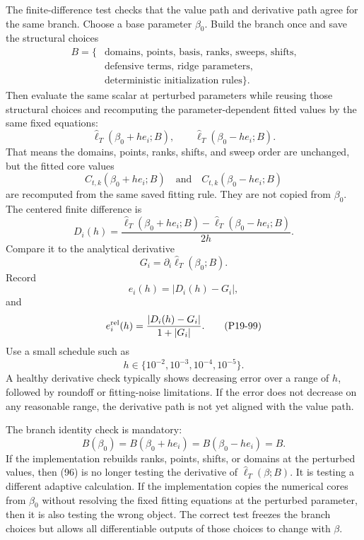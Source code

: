 \documentclass[11pt]{article}
\newcommand{\widehatell}{\widehat\ell}
\begin{document}
The finite-difference test checks that the value path and derivative path agree
for the same branch.  Choose a base parameter \(\beta_0\).  Build the branch
once and save the structural choices
\[
    \begin{aligned}
    B=\{&
    \text{domains, points, basis, ranks, sweeps, shifts,}\\
    &\text{defensive terms, ridge parameters,}\\
    &\text{deterministic initialization rules}\}.
    \end{aligned}
    \tag{P19-94}
\]
Then evaluate the same scalar at perturbed parameters while reusing those
structural choices and recomputing the parameter-dependent fitted values by the
same fixed equations:
\[
    \widehatell_T(\beta_0+h e_i;B),
    \qquad
    \widehatell_T(\beta_0-h e_i;B).
    \tag{P19-95}
\]
That means the domains, points, ranks, shifts, and sweep order are unchanged,
but the fitted core values
\[
    C_{t,k}(\beta_0+h e_i;B)
    \quad\text{and}\quad
    C_{t,k}(\beta_0-h e_i;B)
    \tag{P19-95a}
\]
are recomputed from the same saved fitting rule.  They are not copied from
\(\beta_0\).
The centered finite difference is
\[
    D_i(h)
    =
    \frac{
    \widehatell_T(\beta_0+h e_i;B)
    -
    \widehatell_T(\beta_0-h e_i;B)}
    {2h}.
    \tag{P19-96}
\]
Compare it to the analytical derivative
\[
    G_i=\partial_i\widehatell_T(\beta_0;B).
    \tag{P19-97}
\]
Record
\[
    e_i(h)=|D_i(h)-G_i|,
    \tag{P19-98}
\]
and
\[
    e_i^{\rm rel}(h)
    =
    \frac{|D_i(h)-G_i|}{1+|G_i|}.
    \tag{P19-99}
\]
Use a small schedule such as
\[
    h\in\{10^{-2},10^{-3},10^{-4},10^{-5}\}.
    \tag{P19-100}
\]
A healthy derivative check typically shows decreasing error over a range of
\(h\), followed by roundoff or fitting-noise limitations.  If the error does
not decrease on any reasonable range, the derivative path is not yet aligned
with the value path.

The branch identity check is mandatory:
\[
    B(\beta_0)=B(\beta_0+h e_i)=B(\beta_0-h e_i)=B.
    \tag{P19-101}
\]
If the implementation rebuilds ranks, points, shifts, or domains at the
perturbed values, then (96) is no longer testing the derivative of
\(\widehatell_T(\beta;B)\).  It is testing a different adaptive calculation.
If the implementation copies the numerical cores from \(\beta_0\) without
resolving the fixed fitting equations at the perturbed parameter, then it is
also testing the wrong object.  The correct test freezes the branch choices but
allows all differentiable outputs of those choices to change with \(\beta\).
\end{document}

